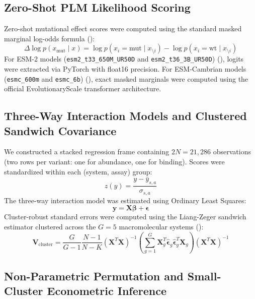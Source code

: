 \documentclass[
  11pt,
  us-letterpaper,
  DIV=11,
  numbers=noendperiod]{scrartcl}
\begin{document}
\subsection{Zero-Shot PLM Likelihood
Scoring}\label{zero-shot-plm-likelihood-scoring}

Zero-shot mutational effect scores were computed using the standard
masked marginal log-odds formula ():
\[\Delta \log p(x_{\text{mut}} \mid x) = \log p(x_i = \text{mut} \mid x_{\setminus i}) - \log p(x_i = \text{wt} \mid x_{\setminus i})\]
For ESM-2 models (\texttt{esm2\_t33\_650M\_UR50D} and
\texttt{esm2\_t36\_3B\_UR50D}) (), logits were extracted via PyTorch with float16 precision.
For ESM-Cambrian models (\texttt{esmc\_600m} and \texttt{esmc\_6b})
(), exact masked
marginals were computed using the official EvolutionaryScale transformer
architecture.

\subsection{Three-Way Interaction Models and Clustered Sandwich
Covariance}\label{three-way-interaction-models-and-clustered-sandwich-covariance}

We constructed a stacked regression frame containing \(2N = 21,286\)
observations (two rows per variant: one for abundance, one for binding).
Scores were standardized within each (system, assay) group:
\[z(y) = \frac{y - \bar{y}_{s, a}}{\sigma_{s, a}}\] The three-way
interaction model was estimated using Ordinary Least Squares:
\[\mathbf{y} = \mathbf{X}\boldsymbol{\beta} + \boldsymbol{\epsilon}\]
Cluster-robust standard errors were computed using the Liang-Zeger
sandwich estimator clustered across the \(G = 5\) macromolecular systems
():
\[\mathbf{V}_{\text{cluster}} = \frac{G}{G-1} \frac{N-1}{N-K} (\mathbf{X}^T \mathbf{X})^{-1} \left( \sum_{g=1}^G \mathbf{X}_g^T \hat{\boldsymbol{\epsilon}}_g \hat{\boldsymbol{\epsilon}}_g^T \mathbf{X}_g \right) (\mathbf{X}^T \mathbf{X})^{-1}\]

\subsection{Non-Parametric Permutation and Small-Cluster Econometric
Inference}\label{non-parametric-permutation-and-small-cluster-econometric-inference}
\end{document}
